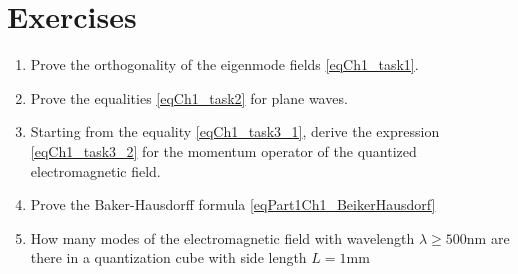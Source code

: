 \section{Exercises}
\begin{enumerate}
\item Prove the orthogonality of the eigenmode fields
  \eqref{eqCh1_task1}.  
\item Prove the equalities \eqref{eqCh1_task2} for plane waves.
\item Starting from the equality \eqref{eqCh1_task3_1}, derive the expression
  \eqref{eqCh1_task3_2} for the momentum operator of the quantized
  electromagnetic field. 
\item Prove the Baker-Hausdorff formula \eqref{eqPart1Ch1_BeikerHausdorf}
\item How many modes \label{qQuantelNumberMods} of the electromagnetic field with
  wavelength $\lambda \ge 500 \mbox{nm}$ are there in a quantization cube
  with side length $L=1 \mbox{mm}$
  \cite{courseIntroQuantumOpticsCoursera} 
\end{enumerate}